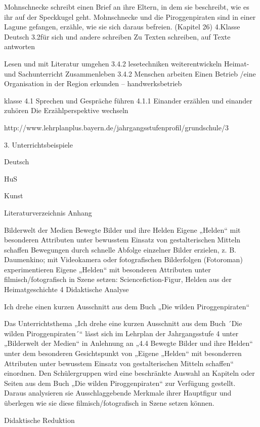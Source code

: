 Mohnschnecke schreibt einen Brief an ihre Eltern, in dem sie beschreibt, wie es ihr auf der Speckkugel geht. Mohnschnecke und die Piroggenpiraten sind in einer Lagune gefangen, erzähle, wie sie sich daraus befreien. (Kapitel 26)
4.Klasse
Deutsch
3.2für sich und andere schreiben
Zu Texten schreiben, auf Texte antworten

Lesen und mit Literatur umgehen
3.4.2 lesetechniken weiterentwickeln
Heimat- und Sachunterricht
Zusammenleben   3.4.2 Menschen arbeiten Einen Betrieb /eine Organisation in der Region erkunden   –  handwerksbetrieb


klasse
4.1 Sprechen und Gespräche führen 
4.1.1 Einander erzählen und einander zuhören   
Die Erzählperspektive wechseln

http://www.lehrplanplus.bayern.de/jahrgangsstufenprofil/grundschule/3

3. Unterrichtsbeispiele




Deutsch

HuS

Kunst

Literaturverzeichnis
Anhang


Bilderwelt der Medien
Bewegte Bilder und ihre Helden
Eigene „Helden“ mit besonderen Attributen unter
bewusstem Einsatz von gestalterischen Mitteln
schaffen
Bewegungen durch schnelle Abfolge einzelner Bilder
erzielen, z. B. Daumenkino; mit Videokamera oder
fotografischen Bilderfolgen (Fotoroman)
experimentieren
Eigene „Helden“ mit besonderen Attributen unter
filmisch/fotografisch in Szene setzen:
Sciencefiction-Figur, Helden aus der
Heimatgeschichte
4 Didaktische Analyse

 Ich drehe einen kurzen Ausschnitt aus dem Buch „Die wilden Piroggenpiraten“

Das Unterrichtsthema „Ich drehe eine kurzen Ausschnitt aus dem Buch ´Die wilden  Piroggenpiraten´“ lässt sich im Lehrplan der Jahrgangsstufe 4 unter „Bilderwelt der Medien“ in Anlehnung an „4.4 Bewegte Bilder und ihre Helden“ unter dem besonderen Gesichtspunkt von „Eigene „Helden“ mit besonderren Attributen unter bewusstem Einsatz von gestalterischen Mitteln schaffen“ einordnen. Den Schülergruppen wird eine beschränkte Auswahl an Kapiteln oder Seiten aus dem Buch „Die wilden Piroggenpiraten“ zur Verfügung gestellt. Daraus analysieren sie Ausschlaggebende Merkmale ihrer Hauptfigur und überlegen wie sie diese filmisch/fotografisch in Szene setzen können.

 Didaktische Reduktion

